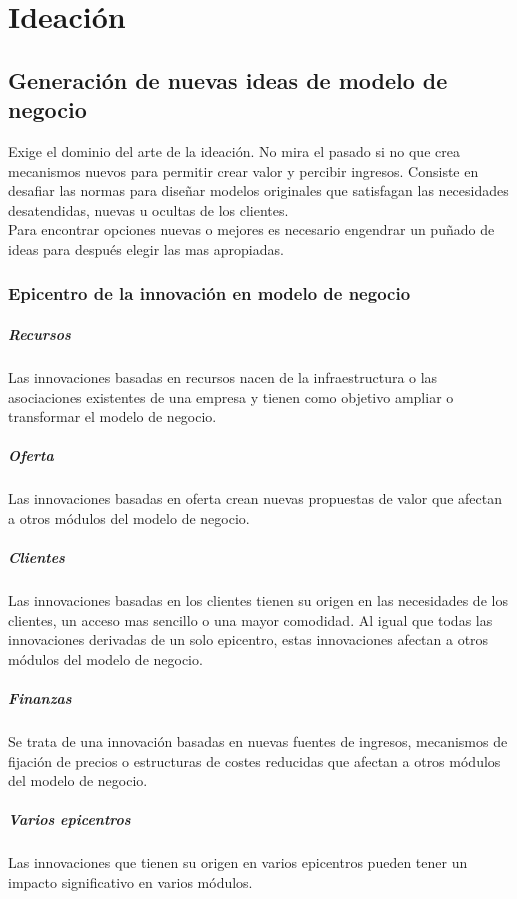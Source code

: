\documentclass[11pt]{book}
\begin{document}
\chapter{Ideación}
\section{Generación de nuevas ideas de modelo de negocio}
Exige el dominio del arte de la ideación. No mira el pasado si no que crea mecanismos nuevos para permitir crear valor y percibir ingresos. 
Consiste en desafiar las normas para diseñar modelos originales que satisfagan las necesidades desatendidas, nuevas u ocultas de los clientes.\\
Para encontrar opciones nuevas o mejores es necesario engendrar un puñado de ideas para después elegir las mas apropiadas.
\subsection{Epicentro de la innovación en modelo de negocio}

\paragraph{Recursos}
Las innovaciones basadas en recursos nacen de la infraestructura o las asociaciones existentes de una empresa y tienen como objetivo ampliar o transformar el modelo de negocio. 
\paragraph{Oferta}
Las innovaciones basadas en oferta crean nuevas propuestas de valor que afectan a otros módulos del modelo de negocio.
\paragraph{Clientes}
Las innovaciones basadas en los clientes tienen su origen en las necesidades de los clientes, un acceso mas sencillo o una mayor comodidad. Al igual que todas las innovaciones derivadas de un solo epicentro, estas innovaciones afectan a otros módulos del modelo de negocio.
\paragraph{Finanzas}
Se trata de una innovación basadas en nuevas fuentes de ingresos, mecanismos de fijación de precios o estructuras de costes reducidas que afectan a otros módulos del modelo de negocio.
\paragraph{Varios epicentros}
Las innovaciones que tienen su origen en varios epicentros pueden tener un impacto significativo en varios módulos.
\end{document}
